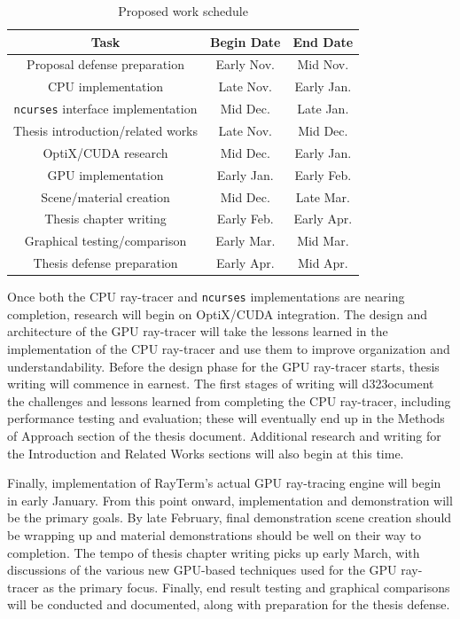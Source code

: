 \documentclass[11pt]{article}
\newcommand{\name}{{\sc RayTerm}}
\begin{document}
\begin{table}[htb]
  \vspace*{0.6em}
  \centering
  \begin{tabular}{|c||c|c|}
    \hline
    \textbf{Task} & \textbf{Begin Date} & \textbf{End Date} \\\hline\hline
    Proposal defense preparation & Early Nov. & Mid Nov. \\\hline
    CPU implementation & Late Nov. & Early Jan. \\\hline
    \texttt{ncurses} interface implementation & Mid Dec. & Late Jan. \\\hline
    Thesis introduction/related works & Late Nov. & Mid Dec. \\\hline
    OptiX/CUDA research & Mid Dec. & Early Jan. \\\hline
    GPU implementation & Early Jan. & Early Feb. \\\hline
    Scene/material creation & Mid Dec. & Late Mar. \\\hline
    Thesis chapter writing & Early Feb. & Early Apr. \\\hline
    Graphical testing/comparison & Early Mar. & Mid Mar. \\\hline
    Thesis defense preparation & Early Apr. & Mid Apr. \\\hline
  \end{tabular}
  \caption{Proposed work schedule}
  \label{worktable}
\end{table}

Once both the CPU ray-tracer and \texttt{ncurses} implementations are nearing completion, research will begin on OptiX/CUDA integration.
The design and architecture of the GPU ray-tracer will take the lessons learned in the implementation of the CPU ray-tracer and use them to improve organization and understandability.
Before the design phase for the GPU ray-tracer starts, thesis writing will commence in earnest.
The first stages of writing will d323ocument the challenges and lessons learned from completing the CPU ray-tracer, including performance testing and evaluation; these will eventually end up in the Methods of Approach section of the thesis document.
Additional research and writing for the Introduction and Related Works sections will also begin at this time.

Finally, implementation of \name's actual GPU ray-tracing engine will begin in early January.
From this point onward, implementation and demonstration will be the primary goals.
By late February, final demonstration scene creation should be wrapping up and material demonstrations should be well on their way to completion.
The tempo of thesis chapter writing picks up early March, with discussions of the various new GPU-based techniques used for the GPU ray-tracer as the primary focus.
Finally, end result testing and graphical comparisons will be conducted and documented, along with preparation for the thesis defense.
\end{document}
